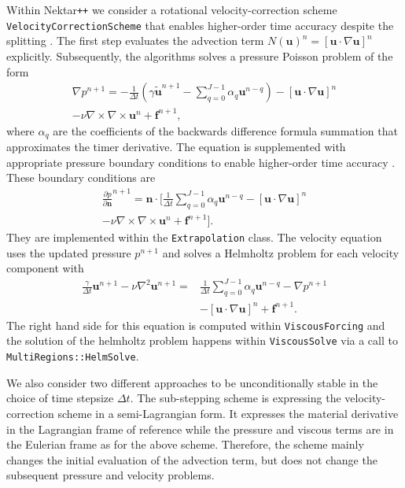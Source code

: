 Within Nektar\verb|++| we consider a rotational velocity-correction scheme \verb|VelocityCorrectionScheme| that enables higher-order time accuracy despite the splitting \cite{Karniadakis1991}.
The first step evaluates the advection term $N(\mathbf{u})^{n} = [\mathbf{u} \cdot \nabla \mathbf{u}]^n$ explicitly.
Subsequently, the algorithms solves a pressure Poisson problem of the form
\begin{align}
    \nabla p^{n+1} =
    - \frac{1}{\Delta t} \left( \gamma \tilde{\mathbf{u}}^{n+1} - \sum_{q=0}^{J-1} \alpha_q \mathbf{u}^{n-q} \right)
    - [\mathbf{u} \cdot \nabla \mathbf{u}]^{n} \nonumber \\
    - \nu \nabla \times \nabla \times \mathbf{u}^{n}
    + \mathbf{f}^{n+1}, \label{eq.vcsPoisson}
\end{align}
where $\alpha_q$ are the coefficients of the backwards difference formula summation that approximates the timer derivative.
The equation is supplemented with appropriate pressure boundary conditions to enable higher-order time accuracy \cite{Karniadakis1991}.
These boundary conditions are
\begin{align}
    \frac{\partial p}{\partial \mathbf{n}}^{n+1} =
    \mathbf{n} \cdot \Bigg[ \frac{1}{\Delta t} \sum_{q=0}^{J-1} \alpha_q \mathbf{u}^{n-q}
    - [\mathbf{u} \cdot \nabla \mathbf{u}]^{n} \nonumber \\
    - \nu \nabla \times \nabla \times \mathbf{u}^{n}
    + \mathbf{f}^{n+1} \Bigg]. \label{eq.vcsPoissonBcs}
\end{align}
They are implemented within the \verb|Extrapolation| class.
The velocity equation uses the updated pressure $p^{n+1}$ and solves a Helmholtz problem for each velocity component with
\begin{align}
    \frac{\gamma}{\Delta t} \mathbf{u}^{n+1}
    - \nu \nabla^2 \mathbf{u}^{n+1}
    =&
    \frac{1}{\Delta t} \sum_{q=0}^{J-1} \alpha_q \mathbf{u}^{n-q}
    - \nabla p^{n+1} \nonumber \\
    &- [\mathbf{u} \cdot \nabla \mathbf{u}]^{n}
    + \mathbf{f}^{n+1}
    . \label{eq.vcsHelmholtz}
\end{align}
The right hand side for this equation is computed within \verb|ViscousForcing| and the solution of the helmholtz problem happens within \verb|ViscousSolve| via a call to \verb|MultiRegions::HelmSolve|.

We also consider two different approaches to be unconditionally stable in the choice of time stepsize $\Delta t$.
The sub-stepping scheme \cite{Sherwin2003} is expressing the velocity-correction scheme in a semi-Lagrangian form.
It expresses the material derivative in the Lagrangian frame of reference while the pressure and viscous terms are in the Eulerian frame as for the above scheme.
Therefore, the scheme mainly changes the initial evaluation of the advection term, but does not change the subsequent pressure and velocity problems.


